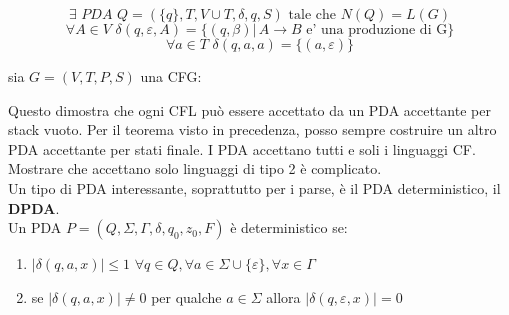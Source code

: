 \documentclass[a4paper,12pt, oneside]{book}
\begin{document}
$$\exists\,\, PDA\,\,Q=(\{q\},T,V\cup T,\delta,q,S)\mbox{ tale che }N(Q)=L(G)$$
$$\forall A\in V\,\,\delta(q,\varepsilon,A)=\{(q,\beta)|\,A\to B\mbox{ e' una produzione di G}\}$$
$$\forall a\in T\,\,\delta(q,a,a)=\{(a,\varepsilon)\}$$
\begin{teorema}
sia $G=(V,T,P,S)$ una CFG:
\end{teorema}
Questo dimostra che ogni CFL può essere accettato da un PDA accettante per stack vuoto. Per il teorema visto in precedenza, posso sempre costruire un altro PDA accettante per stati finale. I PDA accettano tutti e soli i linguaggi CF. Mostrare che accettano solo linguaggi di tipo 2 è complicato.\\
Un tipo di PDA interessante, soprattutto per i parse, è il PDA deterministico, il \textbf{DPDA}.\\
Un PDA $P=(Q,\Sigma,\Gamma,\delta,q_0,z_0,F)$ è deterministico se:
\begin{enumerate}
\item $|\delta(q,a,x)|\leq 1$ $\forall q\in Q,\forall a\in\Sigma\cup\{\varepsilon\},\forall x\in \Gamma$
\item se $|\delta(q,a,x)|\neq 0$ per qualche $a\in \Sigma$ allora $|\delta(q,\varepsilon,x)|=0$
\end{enumerate}
\end{document}
